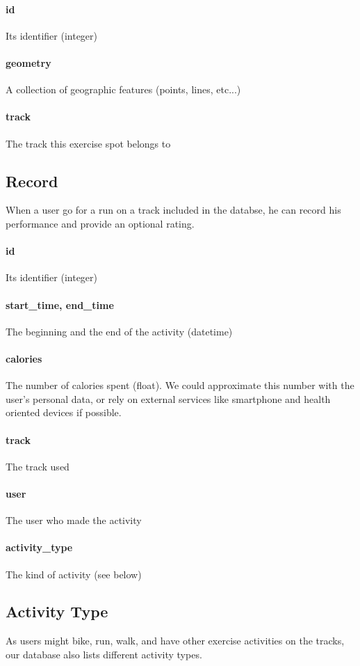 \documentclass[a4paper]{article}
\begin{document}
\paragraph{id} Its identifier (integer)
\paragraph{geometry} A collection of geographic features (points, lines, etc...)
\paragraph{track} The track this exercise spot belongs to


\subsection{Record}
When a user go for a run on a track included in the databse, he can record his
performance and provide an optional rating.

\paragraph{id} Its identifier (integer)
\paragraph{start\_time, end\_time} The beginning and the end of the activity (datetime)
\paragraph{calories} The number of calories spent  (float). We could approximate this number with the user's personal data, or rely on external services like smartphone and health oriented devices if possible.
\paragraph{track} The track used
\paragraph{user} The user who made the activity
\paragraph{activity\_type} The kind of activity (see below)


\subsection{Activity Type}
As users might bike, run, walk, and have other exercise activities on the tracks,
our database also lists different activity types.
\end{document}
